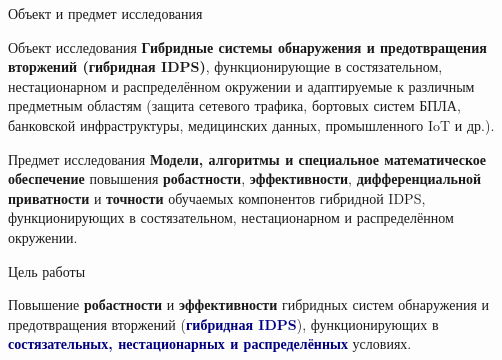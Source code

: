 \documentclass[10pt,aspectratio=169]{beamer}
\newcommand{\hl}[1]{\textcolor{accent}{\textbf{#1}}}
\newcommand{\bn}[1]{\textcolor{navy}{\textbf{#1}}}
\begin{document}
\begin{frame}{Объект и предмет исследования}
\vspace{0.4cm}
\begin{block}{Объект исследования}
\textbf{Гибридные системы обнаружения и предотвращения
вторжений (гибридная IDPS)}, функционирующие в состязательном,
нестационарном и распределённом окружении и адаптируемые к
различным предметным областям (защита сетевого трафика,
бортовых систем БПЛА, банковской инфраструктуры, медицинских
данных, промышленного IoT и др.).
\end{block}
\medskip
\begin{block}{Предмет исследования}
\textbf{Модели, алгоритмы и специальное математическое
обеспечение} повышения \hl{робастности}, \hl{эффективности},
\hl{дифференциальной приватности} и \hl{точности} обучаемых
компонентов гибридной IDPS, функционирующих в состязательном,
нестационарном и распределённом окружении.
\end{block}
\end{frame}

\begin{frame}{Цель работы}
\vspace{2.0cm}
\begin{block}{}
\centering\large
Повышение \hl{робастности} и \hl{эффективности} гибридных
систем обнаружения и предотвращения вторжений
(\bn{гибридная IDPS}), функционирующих в \bn{состязательных,
нестационарных и распределённых} условиях.
\end{block}
\end{frame}
\end{document}
